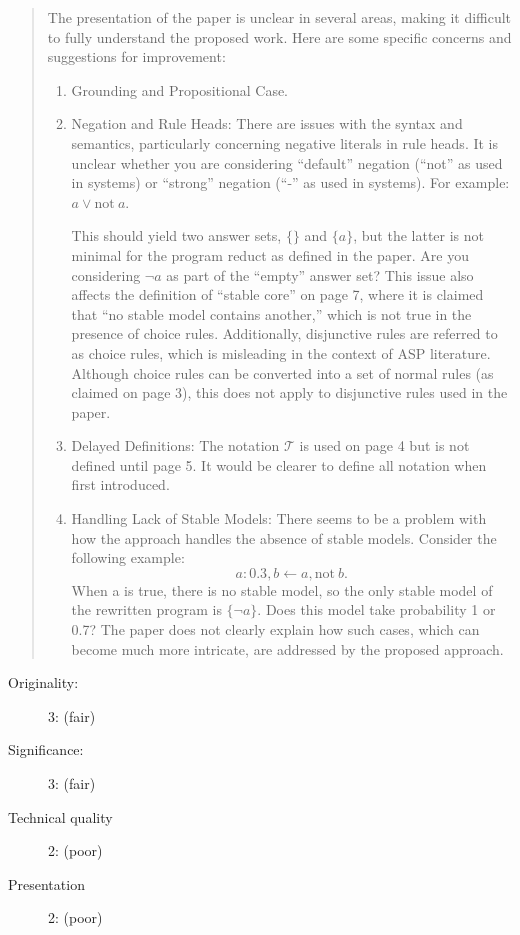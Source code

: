 \documentclass{tlp}
\newcommand{\clause}{\ensuremath{\leftarrow}}
\newcommand{\probfact}[2]{\ensuremath{#1:#2}}
\begin{document}
\begin{quotation}
The presentation of the paper is unclear in several areas, making it difficult to fully understand the proposed work. Here are some specific concerns and suggestions for improvement:

\begin{enumerate}
    \item Grounding and Propositional Case.    
    \item Negation and Rule Heads: There are issues with the syntax and semantics, particularly concerning negative literals in rule heads. It is unclear whether you are considering ``default'' negation (``not'' as used in systems) or ``strong'' negation (``-'' as used in systems). For example: $a \vee \text{not}~a$.

    This should yield two answer sets, $\{\}$ and $\{a\}$, but the latter is not minimal for the program reduct as defined in the paper. Are you considering $\neg a$ as part of the ``empty'' answer set? This issue also affects the definition of ``stable core'' on page 7, where it is claimed that ``no stable model contains another,'' which is not true in the presence of choice rules. Additionally, disjunctive rules are referred to as choice rules, which is misleading in the context of ASP literature. Although choice rules can be converted into a set of normal rules (as claimed on page 3), this does not apply to disjunctive rules used in the paper.

    \item Delayed Definitions: The notation $\mathcal{T}$ is used on page 4 but is not defined until page 5. It would be clearer to define all notation when first introduced.

    \item Handling Lack of Stable Models: There seems to be a problem with how the approach handles the absence of stable models. Consider the following example:
    $$   
\probfact{a}{0.3}, b \clause a, \text{not}~b.
    $$
When a is true, there is no stable model, so the only stable model of the rewritten program is $\{\neg a\}$. Does this model take probability 1 or 0.7? The paper does not clearly explain how such cases, which can become much more intricate, are addressed by the proposed approach.
\end{enumerate} 
\end{quotation}

\begin{description}
    \item[Originality:] 3: (fair)
    \item[Significance:] 3: (fair)
    \item[Technical quality] 2: (poor)
    \item[Presentation] 2: (poor)
\end{description}
\end{document}
